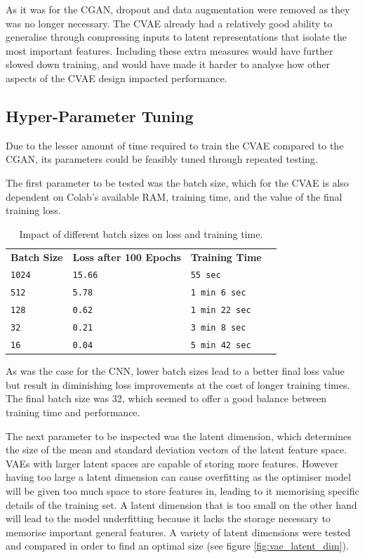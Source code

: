 \documentclass{l4proj}
\begin{document}
As it was for the CGAN, dropout and data augmentation were removed as they was no longer necessary. The CVAE already had a relatively good ability to generalise through compressing inputs to latent representations that isolate the most important features. Including these extra measures would have further slowed down training, and would have made it harder to analyse how other aspects of the CVAE design impacted performance.

\subsection{Hyper-Parameter Tuning}
Due to the lesser amount of time required to train the CVAE compared to the CGAN, its parameters could be feasibly tuned through repeated testing. 

The first parameter to be tested was the batch size, which for the CVAE is also dependent on Colab's available RAM, training time, and the value of the final training loss.
\begin{table}[H]
    \centering
    \caption{Impact of different batch sizes on loss and training time.}
    \label{tab:operators}
    \begin{tabular}{llll}
        \textbf{Batch Size} &   \textbf{Loss after 100 Epochs}       &   \textbf{Training Time} \\   
        \texttt{1024}           &   \texttt{15.66}                   &   \texttt{55 sec}        \\
        \texttt{512}            &   \texttt{5.78}                    &   \texttt{1 min 6 sec}   \\
        \texttt{128}            &   \texttt{0.62}                   &   \texttt{1 min 22 sec}   \\
        \texttt{32}             &   \texttt{0.21}                   &   \texttt{3 min 8 sec}    \\
        \texttt{16}             &   \texttt{0.04}                   &   \texttt{5 min 42 sec}   \\
    \end{tabular}
\end{table}

As was the case for the CNN, lower batch sizes lead to a better final loss value but result in diminishing loss improvements at the cost of longer training times. The final batch size was 32, which seemed to offer a good balance between training time and performance.

The next parameter to be inspected was the latent dimension, which determines the size of the mean and standard deviation vectors of the latent feature space. VAEs with larger latent spaces are capable of storing more features. However having too large a latent dimension can cause overfitting as the optimiser model will be given too much space to store features in, leading to it memorising specific details of the training set. A latent dimension that is too small on the other hand will lead to the model underfitting because it lacks the storage necessary to memorise important general features. A variety of latent dimensions were tested  and compared in order to find an optimal size (see figure \ref{fig:vae_latent_dim}).
\end{document}
